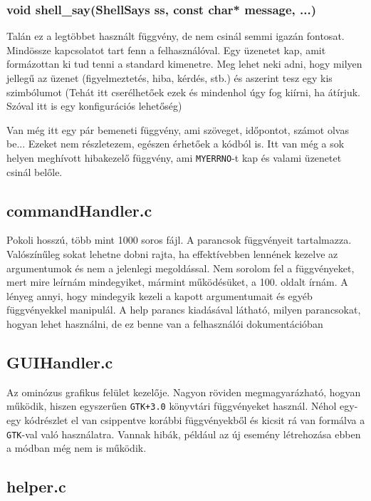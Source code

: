 \documentclass[a4paper]{article}
\begin{document}
\subsubsection{void shell\_say(ShellSays ss, const char* message, ...)}

Talán ez a legtöbbet használt függvény, de nem csinál semmi igazán fontosat. Mindössze kapcsolatot tart fenn a felhasználóval. Egy üzenetet kap, amit formázottan ki tud tenni a standard kimenetre. Meg lehet neki adni, hogy milyen jellegű az üzenet (figyelmeztetés, hiba, kérdés, stb.) és aszerint tesz egy kis szimbólumot (Tehát itt cserélhetőek ezek és mindenhol úgy fog kiírni, ha átírjuk. Szóval itt is egy konfigurációs lehetőség)

Van még itt egy pár bemeneti függvény, ami szöveget, időpontot, számot olvas be... Ezeket nem részletezem, egészen érhetőek a kódból is. Itt van még a sok helyen meghívott hibakezelő függvény, ami \texttt{MYERRNO}-t kap és valami üzenetet csinál belőle.

\subsection{commandHandler.c}

Pokoli hosszú, több mint 1000 soros fájl. A parancsok függvényeit tartalmazza. Valószínűleg sokat lehetne dobni rajta, ha effektívebben lennének kezelve az argumentumok és nem a jelenlegi megoldással. Nem sorolom fel a függvényeket, mert mire leírnám mindegyiket, mármint működésüket, a 100. oldalt írnám. A lényeg annyi, hogy mindegyik kezeli a kapott argumentumait és egyéb függvényekkel manipulál. A help parancs kiadásával látható, milyen parancsokat, hogyan lehet használni, de ez benne van a felhasználói dokumentációban

\subsection{GUIHandler.c}

Az ominózus grafikus felület kezelője. Nagyon röviden megmagyarázható, hogyan működik, hiszen egyszerűen \texttt{GTK+3.0} könyvtári függvényeket használ. Néhol egy-egy kódrészlet el van csippentve korábbi függvényekből és kicsit rá van formálva a \texttt{GTK}-val való használatra. Vannak hibák, például az új esemény létrehozása ebben a módban még nem is működik.

\subsection{helper.c}
\end{document}
